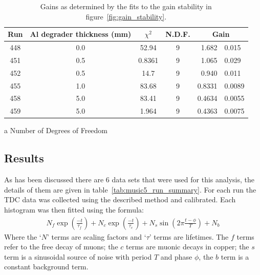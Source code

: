 %
\begin{table}
    \begin{center}
        \begin{threeparttable}
            \begin{tabular}{c|c|c|c|r@{ $\pm$ }l}
                Run & Al degrader thickness (mm) & $\chi^2$ 
                                                 & N.D.F. \tnote{a}
                                                 & \multicolumn{2}{|c}{Gain} \\
                \hline
                448  &  0.0  &  52.94   &  9  &  1.682  &  0.015  \\
                451  &  0.5  &  0.8361  &  9  &  1.065  &  0.029  \\
                452  &  0.5  &  14.7    &  9  &  0.940  &  0.011  \\
                455  &  1.0  &  83.68   &  9  &  0.8331 &  0.0089 \\
                458  &  5.0  &  83.41   &  9  &  0.4634 &  0.0055 \\
                459  &  5.0  &  1.964   &  9  &  0.4363 &  0.0075 \\
            \end{tabular}
            \caption{Gains as determined by the fits to the gain stability in figure~\ref{fig:gain_stability}.}
            \begin{tablenotes}
                \item [a] Number of Degrees of Freedom
            \end{tablenotes}
            \label{tab:gain_stability_paramters}
        \end{threeparttable}
    \end{center}
\end{table}

\subsection{Results} %
\label{sec:results}
As has been discussed there are 6 data sets that were used for this analysis, the details of them are given in table~\ref{tab:music5_run_summary}. For each run the TDC data was collected using the described method and calibrated. Each histogram was then fitted using the formula:
\begin{align}
  N_{f}\exp(\frac{-t}{\tau_{f}}) + N_{c}\exp(\frac{-t}{\tau_{c}}) + N_{s}\sin(2\pi\frac{t-\phi}{T}) + N_{b} \label{equ:fit}
\end{align}
Where the `\(N\)' terms are  scaling factors and `\(\tau\)' terms are lifetimes. The \(f\) terms refer to the free decay of muons; the \(c\) terms are muonic decays in copper; the \(s\) term is a sinusoidal source of noise with period \(T\) and phase \(\phi\), the \(b\) term is a constant background term.

